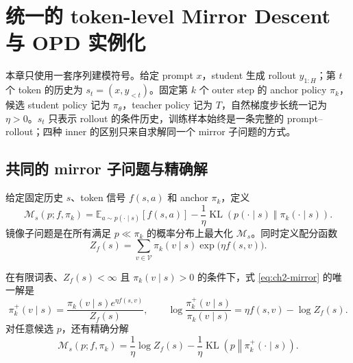 \chapter{统一的 token-level Mirror Descent 与 OPD 实例化}
\label{ch:four-methods}

本章只使用一套序列建模符号。给定 prompt $x$，student 生成 rollout $y_{1:H}$；第 $t$ 个 token 的历史为 $s_t=(x,y_{<t})$。固定第 $k$ 个 outer step 的 anchor policy $\pi_k$，候选 student policy 记为 $\pi_\theta$，teacher policy 记为 $T$，自然梯度步长统一记为 $\eta>0$。$s_t$ 只表示 rollout 的条件历史，训练样本始终是一条完整的 prompt--rollout；四种 inner 的区别只来自求解同一个 mirror 子问题的方式。

\section{共同的 mirror 子问题与精确解}
\label{sec:ch2-common}

\begin{definition}
\label{def:ch2-mirror-subproblem}
给定固定历史 $s$、token 信号 $f(s,a)$ 和 anchor $\pi_k$，定义
\begin{equation}
\label{eq:ch2-mirror}
\mathcal M_s(p;f,\pi_k)
=\mathbb E_{a\sim p(\cdot\mid s)}[f(s,a)]
-\frac1\eta\operatorname{KL}\!\left(p(\cdot\mid s)\middle\Vert\pi_k(\cdot\mid s)\right).
\end{equation}
镜像子问题是在所有满足 $p\ll\pi_k$ 的概率分布上最大化 $\mathcal M_s$。同时定义配分函数
\begin{equation}
\label{eq:ch2-mirror-normalizer}
Z_f(s)=\sum_{v\in\mathcal V}\pi_k(v\mid s)\exp\!\bigl(\eta f(s,v)\bigr).
\end{equation}
\end{definition}

\begin{theorem}
\label{thm:ch2-gibbs}
在有限词表、$Z_f(s)<\infty$ 且 $\pi_k(v\mid s)>0$ 的条件下，式 \eqref{eq:ch2-mirror} 的唯一解是
\begin{equation}
\label{eq:ch2-optimal-policy}
\pi_k^+(v\mid s)=\frac{\pi_k(v\mid s)e^{\eta f(s,v)}}{Z_f(s)},
\qquad
\log\frac{\pi_k^+(v\mid s)}{\pi_k(v\mid s)}
=\eta f(s,v)-\log Z_f(s).
\end{equation}
对任意候选 $p$，还有精确分解
\begin{equation}
\label{eq:ch2-kl-decomp}
\mathcal M_s(p;f,\pi_k)
=\frac1\eta\log Z_f(s)
-\frac1\eta\operatorname{KL}\!\left(p\middle\Vert\pi_k^+(\cdot\mid s)\right).
\end{equation}
\end{theorem}

